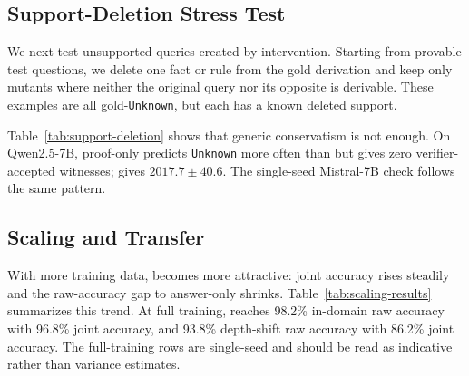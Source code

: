 \begin{table}[t]
\centering
\small

\caption{Supported-query error profile on the fixed 7B suite. Support acc. is
accuracy on gold-True and gold-False examples. Support abstain measures how
often the model emits \texttt{Unknown} on supported queries.}
\label{tab:error-profile}
\end{table}

\subsection{Support-Deletion Stress Test}

We next test unsupported queries created by intervention. Starting from
provable test questions, we delete one fact or rule from the gold derivation and
keep only mutants where neither the original query nor its opposite is
derivable. These examples are all gold-\texttt{Unknown}, but each has a known
deleted support.

\begin{table}[t]
\centering
\small

\caption{Support-deletion mutation stress test on 4,000 gold-\texttt{Unknown}
mutants. Joint is equivalent to verifier-accepted unknown rate on this set.
This is a clean single-deletion intervention, not a noisy real-world benchmark.
Rows report 3-seed means for Qwen2.5-7B and a single seed for Mistral-7B.}
\label{tab:support-deletion}
\end{table}

Table~\ref{tab:support-deletion} shows that generic conservatism is not enough.
On Qwen2.5-7B, proof-only predicts \texttt{Unknown} more often than \model{}
but gives zero verifier-accepted witnesses; \model{} gives \(2017.7 \pm
40.6\). The single-seed Mistral-7B check follows the same pattern.

\subsection{Scaling and Transfer}

With more training data, \model{} becomes more attractive: joint accuracy rises
steadily and the raw-accuracy gap to answer-only shrinks. Table~\ref{tab:scaling-results}
summarizes this trend. At full training, \model{} reaches 98.2\% in-domain raw
accuracy with 96.8\% joint accuracy, and 93.8\% depth-shift raw accuracy with
86.2\% joint accuracy. The full-training rows are single-seed and should be
read as indicative rather than variance estimates.

